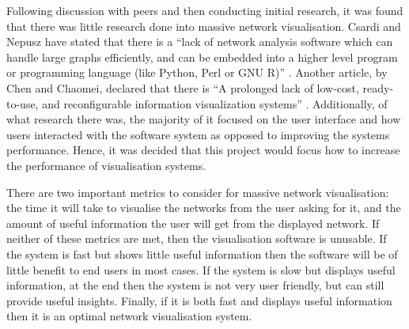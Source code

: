 \documentclass[../dissertation.tex]{subfiles}
\begin{document}
Following discussion with peers and then conducting initial research, it was found that there was little research done into massive network visualisation. Csardi and Nepusz have stated that there is a ``lack of network analysis software which can handle large graphs efficiently, and can be embedded into a higher level program or programming language (like Python, Perl or GNU R)'' \cite{csardi2006igraph}. Another article, by Chen and Chaomei, declared that there is ``A prolonged lack of low-cost, ready-to-use, and reconfigurable information visualization systems'' \cite{chen2005top}. Additionally, of what research there was, the majority of it focused on the user interface and how users interacted with the software system as opposed to improving the systems performance. Hence, it was decided that this project would focus how to increase the performance of visualisation systems.

There are two important metrics to consider for massive network visualisation: the time it will take to visualise the networks from the user asking for it, and the amount of useful information the user will get from the displayed network. If neither of these metrics are met, then the visualisation software is unusable. If the system is fast but shows little useful information then the software will be of little benefit to end users in most cases. If the system is slow but displays useful information, at the end then the system is not very user friendly, but can still provide useful insights. Finally, if it is both fast and displays useful information then it is an optimal network visualisation system.
\end{document}
